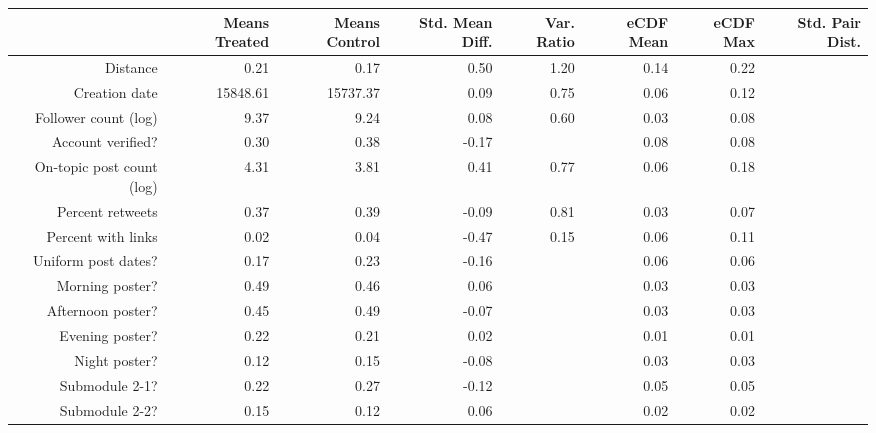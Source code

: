 \begin{table}[ht]
\centering
\begin{tabular}{rrrrrrrr}
  & Means Treated & Means Control & Std. Mean Diff. & Var. Ratio & eCDF Mean & eCDF Max & Std. Pair Dist. \\ 
  \hline
Distance & 0.21 & 0.17 & 0.50 & 1.20 & 0.14 & 0.22 &  \\ 
   \hline
Creation date & 15848.61 & 15737.37 & 0.09 & 0.75 & 0.06 & 0.12 &  \\ 
   \hline
Follower count (log) & 9.37 & 9.24 & 0.08 & 0.60 & 0.03 & 0.08 &  \\ 
   \hline
Account verified? & 0.30 & 0.38 & -0.17 &  & 0.08 & 0.08 &  \\ 
   \hline
On-topic post count (log) & 4.31 & 3.81 & 0.41 & 0.77 & 0.06 & 0.18 &  \\ 
   \hline
Percent retweets & 0.37 & 0.39 & -0.09 & 0.81 & 0.03 & 0.07 &  \\ 
   \hline
Percent with links & 0.02 & 0.04 & -0.47 & 0.15 & 0.06 & 0.11 &  \\ 
   \hline
Uniform post dates? & 0.17 & 0.23 & -0.16 &  & 0.06 & 0.06 &  \\ 
   \hline
Morning poster? & 0.49 & 0.46 & 0.06 &  & 0.03 & 0.03 &  \\ 
   \hline
Afternoon poster? & 0.45 & 0.49 & -0.07 &  & 0.03 & 0.03 &  \\ 
   \hline
Evening poster? & 0.22 & 0.21 & 0.02 &  & 0.01 & 0.01 &  \\ 
   \hline
Night poster? & 0.12 & 0.15 & -0.08 &  & 0.03 & 0.03 &  \\ 
   \hline
Submodule 2-1? & 0.22 & 0.27 & -0.12 &  & 0.05 & 0.05 &  \\ 
   \hline
Submodule 2-2? & 0.15 & 0.12 & 0.06 &  & 0.02 & 0.02 &  \\ 
   \hline
\end{tabular}
\end{table}
